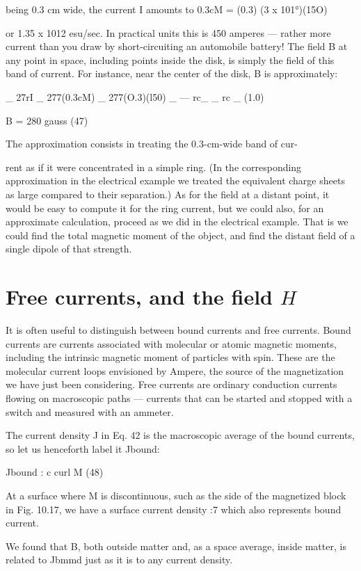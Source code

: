 {{{%
being 0.3 cm wide, the current I amounts to
0.3cM = (0.3) (3 x 101°)(15O)

or 1.35 x 1012 esu/sec. In practical units this is 450 amperes --- 
rather more current than you draw by short-circuiting an automobile
battery! The field B at any point in space, including points inside
the disk, is simply the field of this band of current. For instance,
near the center of the disk, B is approximately:

_ 27rI _ 277(0.3cM) _ 277(O.3)(l50)
_  --- rc_ _ rc _ (1.0)

B = 280 gauss (47)

The approximation consists in treating the 0.3-cm-wide band of cur-

rent as if it were concentrated in a simple ring. (In the corresponding
approximation in the electrical example we treated the equivalent
charge sheets as large compared to their separation.) As for
the field at a distant point, it would be easy to compute it for the
ring current, but we could also, for an approximate calculation,
proceed as we did in the electrical example. That is we could find
the total magnetic moment of the object, and find the distant field
of a single dipole of that strength.

\section{Free currents, and the field $H$}

It is often useful to distinguish between bound currents and free
currents. Bound currents are currents associated with molecular
or atomic magnetic moments, including the intrinsic magnetic
moment of particles with spin. These are the molecular current
loops envisioned by Ampere, the source of the magnetization we
have just been considering. Free currents are ordinary conduction
currents flowing on macroscopic paths --- currents that can be started
and stopped with a switch and measured with an ammeter.

The current density J in Eq. 42 is the macroscopic average of the
bound currents, so let us henceforth label it Jbound:

Jbound : c curl M (48)

At a surface where M is discontinuous, such as the side of the magnetized
block in Fig. 10.17, we have a surface current density :7 which
also represents bound current.

We found that B, both outside matter and, as a space average,
inside matter, is related to Jbmmd just as it is to any current density.

}}}
